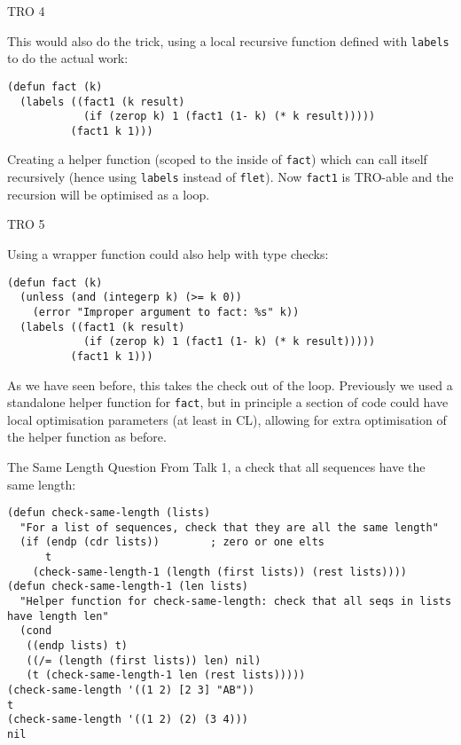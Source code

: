 \documentclass[presentation]{beamer}
\begin{document}
\begin{frame}[fragile]{TRO 4}
\label{sec:orgc4e4ea1}

This would also do the trick, using a local recursive function defined with \texttt{labels} to do the actual work:

\begin{verbatim}
(defun fact (k)
  (labels ((fact1 (k result)
            (if (zerop k) 1 (fact1 (1- k) (* k result)))))
          (fact1 k 1)))
\end{verbatim}

Creating a helper function (scoped to the inside of \texttt{fact}) which can call itself recursively (hence using \texttt{labels} instead of \texttt{flet}).  Now \texttt{fact1} is TRO-able and the recursion will be optimised as a loop.
\end{frame}
\begin{frame}[fragile]{TRO 5}
\label{sec:orgc4e4ea1}

Using a wrapper function could also help with type checks:

\begin{verbatim}
(defun fact (k)
  (unless (and (integerp k) (>= k 0))
    (error "Improper argument to fact: %s" k))
  (labels ((fact1 (k result)
            (if (zerop k) 1 (fact1 (1- k) (* k result)))))
          (fact1 k 1)))
\end{verbatim}

As we have seen before, this takes the check out of the loop.  Previously we used a standalone helper function for \texttt{fact}, but in principle a section of code could have local optimisation parameters (at least in CL), allowing for extra optimisation of the helper function as before.

\end{frame}

\begin{frame}[fragile]{The Same Length Question}
From Talk 1, a check that all sequences have the same length:
\begin{verbatim}
(defun check-same-length (lists)
  "For a list of sequences, check that they are all the same length"
  (if (endp (cdr lists))		; zero or one elts
      t
    (check-same-length-1 (length (first lists)) (rest lists))))
(defun check-same-length-1 (len lists)
  "Helper function for check-same-length: check that all seqs in lists have length len"
  (cond
   ((endp lists) t)
   ((/= (length (first lists)) len) nil)
   (t (check-same-length-1 len (rest lists)))))
(check-same-length '((1 2) [2 3] "AB"))
t
(check-same-length '((1 2) (2) (3 4)))
nil
\end{verbatim}
\end{frame}
\end{document}
